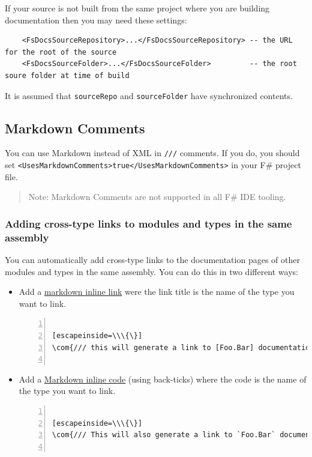 \documentclass{article}
\newcommand{\com}[1]{\textcolor{officegreen}{#1}}
\begin{document}
If your source is not built from the same project where you are building documentation then
you may need these settings:
\begin{lstlisting}
    <FsDocsSourceRepository>...</FsDocsSourceRepository> -- the URL for the root of the source
    <FsDocsSourceFolder>...</FsDocsSourceFolder>         -- the root soure folder at time of build

\end{lstlisting}


It is assumed that \texttt{sourceRepo} and \texttt{sourceFolder} have synchronized contents.
\subsection*{Markdown Comments}



You can use Markdown instead of XML in \texttt{///} comments. If you do, you should set \texttt{<UsesMarkdownComments>true</UsesMarkdownComments>} in
your F\# project file.
\begin{quote}


Note: Markdown Comments are not supported in all F\# IDE tooling.
\end{quote}

\subsubsection*{Adding cross-type links to modules and types in the same assembly}



You can automatically add cross-type links to the documentation pages of other modules and types in the same assembly.
You can do this in two different ways:
\begin{itemize}
\item 

Add a \href{https://github.com/adam-p/markdown-here/wiki/Markdown-Cheatsheet\#links}{markdown inline link} were the link
title is the name of the type you want to link.
\begin{lstlisting}[numbers=left]

[escapeinside=\\\{\}]
\com{/// this will generate a link to [Foo.Bar] documentation}


\end{lstlisting}


\item 

Add a \href{https://github.com/adam-p/markdown-here/wiki/Markdown-Cheatsheet\#code}{Markdown inline code} (using
back-ticks) where the code is the name of the type you want to link.
\begin{lstlisting}[numbers=left]

[escapeinside=\\\{\}]
\com{/// This will also generate a link to `Foo.Bar` documentation}


\end{lstlisting}


\end{itemize}
\end{document}
